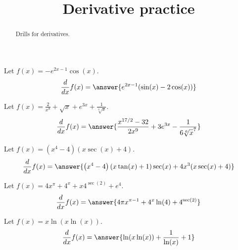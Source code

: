 \documentclass{ximera}
\title[Reinforce:]{Derivative practice}
\begin{document}
\begin{abstract}
  Drills for derivatives.
\end{abstract}
\maketitle


\begin{shuffle}


\begin{exercise}
Let $f(x)=-e^{2 x-1} \cos (x)$.
\[
\ddx f(x) = \answer{e^{2 x-1} (\sin (x)-2 \cos (x))}
\]
\end{exercise}

\begin{exercise}
Let $f(x)=\frac{2}{x^8}+\sqrt{x}+e^{3 x}+\frac{1}{\sqrt[6]{x}}$.
\[
\ddx f(x) = \answer{\frac{x^{17/2}-32}{2 x^9}+3 e^{3 x}-\frac{1}{6 \sqrt[6]{x}^7}}
\]
\end{exercise}

\begin{exercise}
Let $f(x)=\left(x^4-4\right) (x \sec (x)+4)$.
\[
\ddx f(x) = \answer{\left(x^4-4\right) (x \tan (x)+1) \sec (x)+4 x^3 (x \sec (x)+4)}
\]
\end{exercise}

\begin{exercise}
Let $f(x)=4 x^{\pi }+4^x+x 4^{\sec (2)}+e^4$.
\[
\ddx f(x) = \answer{4 \pi  x^{\pi -1}+4^x \ln (4)+4^{\sec (2)}}
\]
\end{exercise}



\begin{exercise}
Let $f(x)=x \ln (x \ln (x))$.
\[
\ddx f(x) = \answer{\ln (x \ln (x))+\frac{1}{\ln (x)}+1}
\]
\end{exercise}


\end{shuffle}
\end{document}
